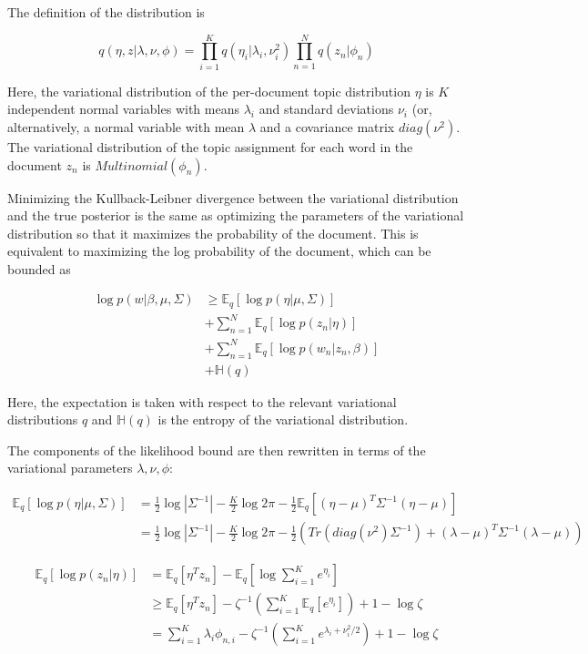 \documentclass[12pt,a4paper,twoside,openright]{report}
\begin{document}
The definition of the distribution is

\begin{equation}
q(\eta, z | \lambda, \nu, \phi) = \prod\limits_{i=1}^K q(\eta_i|\lambda_i, \nu_i^2) \prod\limits_{n=1}^N q(z_n | \phi_n)
\end{equation}

Here, the variational distribution of the per-document topic distribution $\eta$ is $K$ independent normal variables with means $\lambda_i$ and standard deviations $\nu_i$ (or, alternatively, a normal variable with mean $\lambda$ and a covariance matrix $\mathit{diag}(\nu^2)$. The variational distribution of the topic assignment for each word in the document $z_n$ is $\mathit{Multinomial}(\phi_n)$.

Minimizing the Kullback-Leibner divergence between the variational distribution and the true posterior is the same as optimizing the parameters of the variational distribution so that it maximizes the probability of the document. This is equivalent to maximizing the log probability of the document, which can be bounded as

\begin{align}\label{eq:likelihood-bound}
\log p(w | \beta, \mu, \Sigma) & \geq \mathbb{E}_q[\log p(\eta|\mu, \Sigma)] \\
& + \sum\limits_{n=1}^N \mathbb{E}_q[\log p(z_n | \eta)] \\
& + \sum\limits_{n=1}^N \mathbb{E}_q[\log p(w_n | z_n, \beta)] \\
& + \mathbb{H}(q)
\end{align}

Here, the expectation is taken with respect to the relevant variational distributions $q$ and $\mathbb{H}(q)$ is the entropy of the variational distribution.

The components of the likelihood bound are then rewritten in terms of the variational parameters $\lambda, \nu, \phi$:

\begin{align}
\mathbb{E}_q[\log p(\eta|\mu, \Sigma)] & = \frac{1}{2} \log |\Sigma^{-1}| - \frac{K}{2} \log 2 \pi - \frac{1}{2}\mathbb{E}_q[(\eta - \mu)^T\Sigma^{-1}(\eta - \mu)] \\ \label{eq:eta_mu_sigma}
& = \frac{1}{2} \log |\Sigma^{-1}| - \frac{K}{2} \log 2 \pi - \frac{1}{2}(\mathit{Tr}(\mathit{diag}(\nu^2)\Sigma^{-1}) + (\lambda - \mu)^T\Sigma^{-1}(\lambda - \mu))
\end{align}

\begin{align}
\mathbb{E}_q[\log p(z_n | \eta)] & = \mathbb{E}_q[\eta^Tz_n] - \mathbb{E}_q[\log \sum\limits_{i=1}^K e^{\eta_i}] \\
& \geq \mathbb{E}_q[\eta^Tz_n] - \zeta^{-1}\left(\sum\limits_{i=1}^K\mathbb{E}_q[e^{\eta_i}]\right) + 1 - \log\zeta \\
& = \sum\limits_{i=1}^K\lambda_i\phi_{n, i} - \zeta^{-1}\left(\sum\limits_{i=1}^Ke^{\lambda_i + \nu_i^2 / 2}\right) + 1 - \log\zeta
\end{align}
\end{document}
